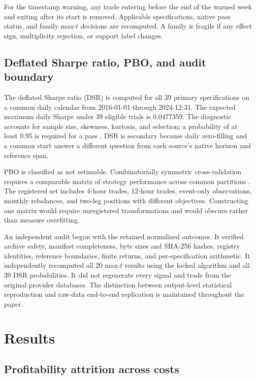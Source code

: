 For the timestamp warning, any trade entering before the end of the warned week and exiting after its start is removed. Applicable specifications, native pass status, and family max-$t$ decisions are recomputed. A family is fragile if any effect sign, multiplicity rejection, or support label changes.

\subsection{Deflated Sharpe ratio, PBO, and audit boundary}\label{subsec:diagnostics}

The deflated Sharpe ratio (DSR) is computed for all 39 primary specifications on a common daily calendar from 2016-01-01 through 2024-12-31. The expected maximum daily Sharpe under 39 eligible trials is 0.0477359. The diagnostic accounts for sample size, skewness, kurtosis, and selection; a probability of at least 0.95 is required for a pass \citep{bailey2014}. DSR is secondary because daily zero-filling and a common start answer a different question from each source's native horizon and reference span.

PBO is classified as not estimable. Combinatorially symmetric cross-validation requires a comparable matrix of strategy performance across common partitions \citep{bailey2017}. The registered set includes 4-hour trades, 12-hour trades, event-only observations, monthly rebalances, and two-leg positions with different objectives. Constructing one matrix would require unregistered transformations and would obscure rather than measure overfitting.

An independent audit began with the retained normalized outcomes. It verified archive safety, manifest completeness, byte sizes and SHA-256 hashes, registry identities, reference boundaries, finite returns, and per-specification arithmetic. It independently recomputed all 20 max-$t$ results using the locked algorithm and all 39 DSR probabilities. It did not regenerate every signal and trade from the original provider databases. The distinction between output-level statistical reproduction and raw-data end-to-end replication is maintained throughout the paper.

\section{Results}\label{sec:results}

\subsection{Profitability attrition across costs}\label{subsec:attrition}

